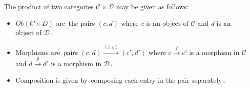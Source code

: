 
The product of two categories $\mathcal{C}\times \mathcal{D}$ may be given as follows:
\begin{itemize}
  \item $Ob(C\times D)$ are \,the pairs $(c,d)$ where \emph{c} is an object of $\mathcal{C}$ and \emph{d} is an object of $\mathcal{D}$\,.
  \item Morphisms are \,pairs $(c,d)\xrightarrow{(f,g)}(c',d')$ where $c \xrightarrow{f}c'$ is a morphism in $\mathcal{C}$ and $d \xrightarrow{g}d'$ is a morphism in $\mathcal{D}$\,.
  \item Composition is given by \,composing each entry in the pair separately\,.
\end{itemize}